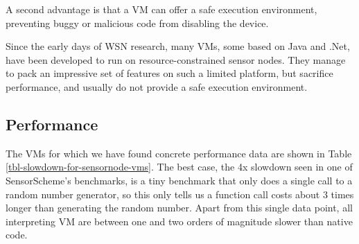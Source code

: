 A second advantage is that a VM can offer a safe execution environment, preventing buggy or malicious code from disabling the device.


Since the early days of WSN research, many VMs, some based on Java and .Net, have been developed to run on resource-constrained sensor nodes. They manage to pack an impressive set of features on such a limited platform, but sacrifice performance, and usually do not provide a safe execution environment.

\subsection{Performance}
\label{sec-introduction-performance}
The VMs for which we have found concrete performance data are shown in Table \ref{tbl-slowdown-for-sensornode-vms}. The best case, the 4x slowdown seen in one of SensorScheme's benchmarks, is a tiny benchmark that only does a single call to a random number generator, so this only tells us a function call costs about 3 times longer than generating the random number. Apart from this single data point, all interpreting VM are between one and two orders of magnitude slower than native code.

